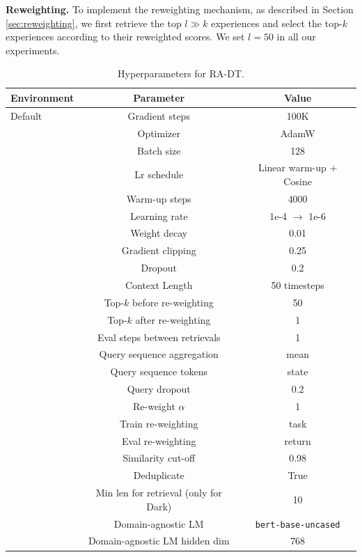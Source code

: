 \textbf{Reweighting.}
To implement the reweighting mechanism, as described in Section \ref{sec:reweighting}, we first retrieve the top $l\gg k$ experiences and select the top-$k$ experiences according to their reweighted scores. 
We set $l=50$ in all our experiments.  

\begin{table}[]
    \centering
    \caption{Hyperparameters for RA-DT.}
    \begin{tabular}{l | c c}
    \toprule
    \textbf{Environment} & \textbf{Parameter} & \textbf{Value} \\
    \midrule
     Default &      Gradient steps & 100K \\
      &      Optimizer & AdamW \\
      &      Batch size & 128 \\
      &      Lr schedule & Linear warm-up + Cosine \\
      &      Warm-up steps & 4000 \\
      &      Learning rate & 1e-4 $\rightarrow$ 1e-6\\
      &      Weight decay & 0.01 \\
      &      Gradient clipping & 0.25 \\
      &      Dropout & 0.2 \\
      &      Context Length & 50 timesteps \\
      &      Top-$k$ before re-weighting & 50 \\
      &      Top-$k$ after re-weighting & 1 \\
      &      Eval steps between retrievals & 1 \\
      &      Query sequence aggregation & mean \\
      &      Query sequence tokens & state \\
      &      Query dropout & 0.2 \\
      &      Re-weight $\alpha$ & 1 \\
      &      Train re-weighting & task \\
      &      Eval re-weighting & return \\
      &      Similarity cut-off & 0.98 \\
      &      Deduplicate & True \\
      &      Min len for retrieval (only for Dark) & 10 \\
      &      Domain-agnostic LM & \texttt{bert-base-uncased} \\
      &      Domain-agnostic LM hidden dim & 768 \\

\end{tabular}
\end{table}
